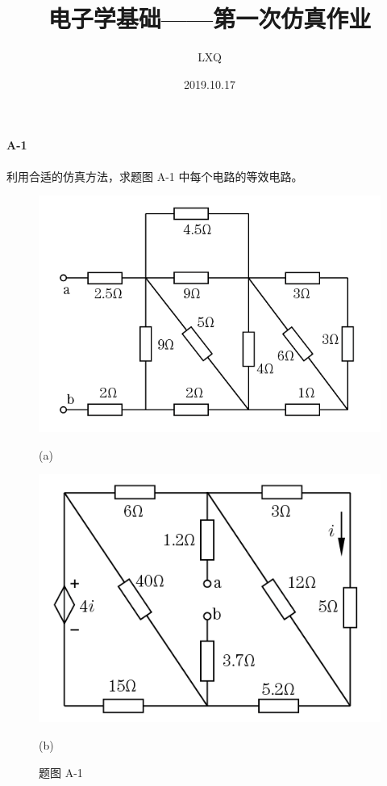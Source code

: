 \documentclass[hyperref, UTF8]{ctexart}
\title{电子学基础——第一次仿真作业}
\author{LXQ}
\date{2019.10.17}
\begin{document}
\maketitle

\paragraph{A-1}
利用合适的仿真方法，求题图 A-1 中每个电路的等效电路。

\begin{figure}[!htb]
\centering
\begin{minipage}[t]{0.389\textwidth}
\centering
\includegraphics[width=1\textwidth]{pA-1-a.png}
\caption*{(a)}
\end{minipage}
\begin{minipage}[t]{0.333\textwidth}
\centering
\includegraphics[width=1\textwidth]{pA-1-b.png}
\caption*{(b)}
\end{minipage}
\caption*{题图 A-1}
\end{figure}
\end{document}
